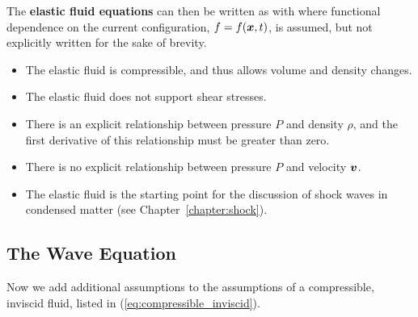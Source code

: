 \begin{Hresult}
The {\bf elastic fluid equations} can then be written as
\be
{}
\label{eq:elastic_fluid_momentum}
\ee
with
\be
{}
\label{eq:elastic_fluid_mass}
\ee
where functional dependence on the current configuration, 
$f = f(\mbox{\boldmath $x$}, t)$, 
is assumed, but not explicitly written for the sake of brevity.
\end{Hresult}

\begin{Hremark}
\begin{itemize}[noitemsep]
\item The elastic fluid is compressible, and thus allows
volume and density changes.
\item The elastic fluid does not support shear stresses.
\item There is an explicit relationship between pressure $P$ and 
density $\rho$, and the first derivative of this relationship must
be greater than zero.  
\item There is no explicit relationship between pressure $P$ and 
velocity $\mbox{\boldmath $v$}$.
\item The elastic fluid is the starting point for the discussion of
shock waves in condensed matter (see Chapter~\ref{chapter:shock}).
\end{itemize}
\end{Hremark}


\subsection{The Wave Equation}
Now we add additional assumptions to the assumptions of a 
compressible, inviscid fluid, listed in 
(\ref{eq:compressible_inviscid}).


